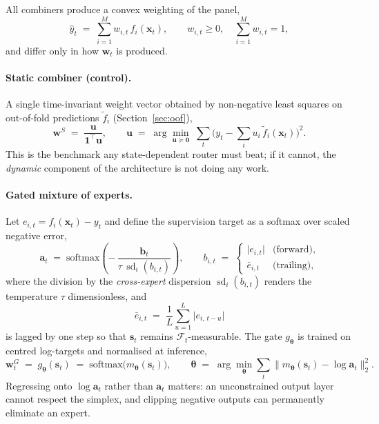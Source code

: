 All combiners produce a convex weighting of the panel,
\begin{equation}
\label{eq:combine}
\hat{y}_t \;=\; \sum_{i=1}^{M} w_{i,t}\, f_i(\bm{x}_t),
\qquad w_{i,t}\ge 0,\quad \sum_{i=1}^{M} w_{i,t}=1 ,
\end{equation}
and differ only in how $\bm{w}_t$ is produced.

\paragraph{Static combiner (control).} A single time-invariant weight vector
obtained by non-negative least squares on out-of-fold predictions
$\tilde{f}_i$ (Section~\ref{sec:oof}),
\begin{equation}
\label{eq:static}
\bm{w}^{S} \;=\; \frac{\bm{u}}{\bm{1}^{\!\top}\bm{u}},
\qquad
\bm{u} \;=\; \arg\min_{\bm{u}\succeq \bm{0}}\;
\sum_{t}\Big(y_t - \sum_i u_i\,\tilde{f}_i(\bm{x}_t)\Big)^{2}.
\end{equation}
This is the benchmark any state-dependent router must beat; if it cannot, the
\emph{dynamic} component of the architecture is not doing any work.

\paragraph{Gated mixture of experts.} Let $e_{i,t}=f_i(\bm{x}_t)-y_t$ and define
the supervision target as a softmax over scaled negative error,
\begin{equation}
\label{eq:oracle}
\bm{a}_t \;=\; \mathrm{softmax}\!\left(-\,\frac{\bm{b}_t}{\tau\,\operatorname{sd}_i(b_{i,t})}\right),
\qquad
b_{i,t} \;=\;
\begin{cases}
\lvert e_{i,t}\rvert & \text{(forward)},\\[2pt]
\bar{e}_{i,t} & \text{(trailing)},
\end{cases}
\end{equation}
where the division by the \emph{cross-expert} dispersion $\operatorname{sd}_i(b_{i,t})$
renders the temperature $\tau$ dimensionless, and
\begin{equation}
\label{eq:trailerr}
\bar{e}_{i,t} \;=\; \frac{1}{L}\sum_{u=1}^{L}\lvert e_{i,\,t-u}\rvert
\end{equation}
is lagged by one step so that $\bm{s}_t$ remains $\mathcal{F}_t$-measurable. The
gate $g_{\bm\theta}$ is trained on centred log-targets and normalised at inference,
\begin{equation}
\bm{w}^{G}_t \;=\; g_{\bm\theta}(\bm{s}_t) \;=\; \mathrm{softmax}\big(m_{\bm\theta}(\bm{s}_t)\big),
\qquad
\bm{\theta} \;=\; \arg\min_{\bm\theta}\sum_t \big\lVert m_{\bm\theta}(\bm{s}_t) - \log \bm{a}_t \big\rVert_2^2 .
\end{equation}
Regressing onto $\log \bm{a}_t$ rather than $\bm{a}_t$ matters: an unconstrained
output layer cannot respect the simplex, and clipping negative outputs can
permanently eliminate an expert.

